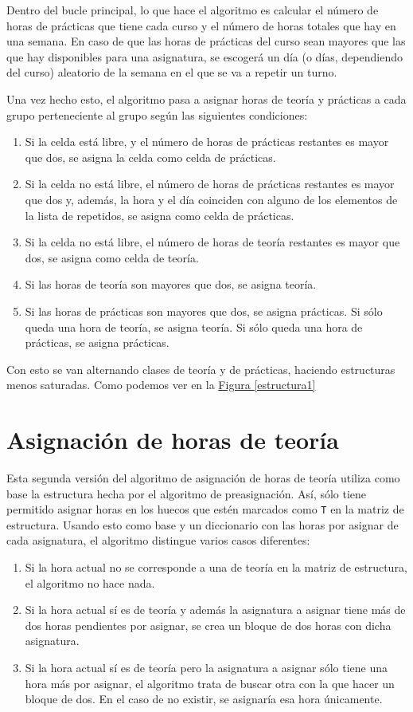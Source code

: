 Dentro del bucle principal, lo que hace el algoritmo es calcular el número de horas de prácticas que tiene cada curso y el número de horas totales que hay en una semana. En caso de que las horas de prácticas del curso sean mayores que las que hay disponibles para una asignatura, se escogerá un día (o días, dependiendo del curso) aleatorio de la semana en el que se va a repetir un turno.

Una vez hecho esto, el algoritmo pasa a asignar horas de teoría y prácticas a cada grupo perteneciente al grupo según las siguientes condiciones:

\begin{enumerate}
  \item Si la celda está libre, y el número de horas de prácticas restantes es mayor que dos, se asigna la celda como celda de prácticas.
  \item Si la celda no está libre, el número de horas de prácticas restantes es mayor que dos y, además, la hora y el día coinciden con alguno de los elementos de la lista de repetidos, se asigna como celda de prácticas.
  \item Si la celda no está libre, el número de horas de teoría restantes es mayor que dos, se asigna como celda de teoría.
  \item Si las horas de teoría son mayores que dos, se asigna teoría.
  \item Si las horas de prácticas son mayores que dos, se asigna prácticas.
  \itme Si sólo queda una hora de teoría, se asigna teoría.
  \itme Si sólo queda una hora de prácticas, se asigna prácticas.
\end{enumerate}

Con esto se van alternando clases de teoría y de prácticas, haciendo estructuras menos saturadas. Como podemos ver en la \hyperref[estructura1]{Figura \ref*{estructura1}}

\section{Asignación de horas de teoría}
Esta segunda versión del algoritmo de asignación de horas de teoría utiliza como base la estructura hecha por el algoritmo de preasignación. Así, sólo tiene permitido asignar horas en los huecos que estén marcados como \texttt{T} en la matriz de estructura. Usando esto como base y un diccionario con las horas por asignar de cada asignatura, el algoritmo distingue varios casos diferentes:

\begin{enumerate}[---]
  \item Si la hora actual no se corresponde a una de teoría en la matriz de estructura, el algoritmo no hace nada.
  \item Si la hora actual sí es de teoría y además la asignatura a asignar tiene más de dos horas pendientes por asignar, se crea un bloque de dos horas con dicha asignatura.
  \item Si la hora actual sí es de teoría pero la asignatura a asignar sólo tiene una hora más por asignar, el algoritmo trata de buscar otra con la que hacer un bloque de dos. En el caso de no existir, se asignaría esa hora únicamente.
\end{enumerate}

